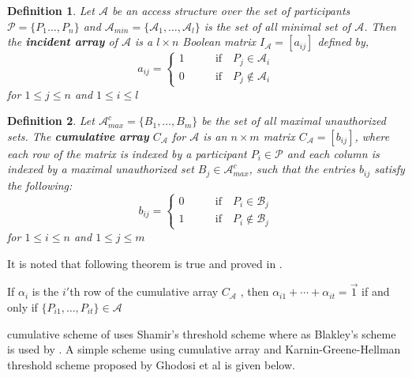 \documentclass{llncs}
\newtheorem{defn}{Definition}
\begin{document}
    \begin{defn}
      Let $\mathcal{A}$ be an access structure over the set of participants $\mathcal{P}=\{P_1\ldots ,P_n\}$ and    $\mathcal{A}_{min}=\{\mathcal{A}_1,\ldots,\mathcal{A}_{l}\}$ is the set of all minimal set of $\mathcal{A}$. Then the \textbf{incident array} of $\mathcal{A}$ is a $l \times n$ Boolean matrix $I_{\mathcal{A}}=[a_{ij}]$ defined by,
      \[
      a_{ij}=
   \begin{cases}
    1 \qquad & \text{if} \quad P_j \in \mathcal{A}_i \\
    0 \qquad & \text{if}  \quad P_j \notin \mathcal{A}_i
   \end{cases}
   \]
 for $1 \le j \le n$ and $1 \le i \le l$
 \end{defn}
 \begin{defn}
Let $\mathcal{A}_{max}^c=\{B_1,\ldots,B_m\}$ be the set of all maximal unauthorized sets. The \textbf{cumulative array} $C_{\mathcal{A}}$ for $\mathcal{A}$ is an $n \times m$ matrix $C_{\mathcal{A}}=[b_{ij}]$, where each row of the matrix is indexed by a participant $P_i \in \mathcal{P}$ and each column is indexed by a maximal unauthorized set $B_j \in \mathcal{A}_{max}^c$, such that the entries $b_{ij}$ satisfy the following:
       \[
            b_{ij}=
         \begin{cases}
          0 \qquad & \text{if} \quad P_i \in \mathcal{B}_j\\
          1 \qquad & \text{if}  \quad P_i \notin \mathcal{B}_j
         \end{cases}
         \]
         for $1 \le i \le n$ and $1 \le j \le m$
 \end{defn} 
      It is noted that following theorem is true and proved in \cite{ghodosi1998construction}.
 \begin{theorem}
      If $\alpha_i$ is the $i'$th row of the cumulative array $C_{\mathcal{A}}$ , then $\alpha_{i1}+\cdots+\alpha_{it}=\overrightarrow{1}$ if and only if $\{P_{i1},\ldots,P_{it}\} \in \mathcal{A}$
 \end{theorem}
 
 cumulative scheme of \cite{ito1989secret} uses Shamir's threshold \cite{shamir1979} scheme where as Blakley's scheme is used by \cite{jackson1993cumulative}. A simple scheme using cumulative array and Karnin-Greene-Hellman threshold scheme \cite{karnin1983} proposed by Ghodosi et al \cite{ghodosi1998construction} is given below.
\end{document}
